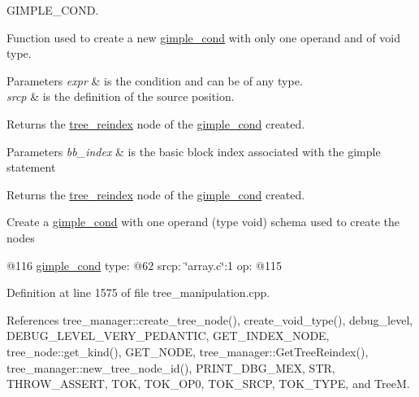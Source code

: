 G\+I\+M\+P\+L\+E\+\_\+\+C\+O\+ND. 

Function used to create a new \hyperlink{structgimple__cond}{gimple\+\_\+cond} with only one operand and of void type. 
\begin{DoxyParams}{Parameters}
{\em expr} & is the condition and can be of any type. \\
\hline
{\em srcp} & is the definition of the source position. \\
\hline
\end{DoxyParams}
\begin{DoxyReturn}{Returns}
the \hyperlink{classtree__reindex}{tree\+\_\+reindex} node of the \hyperlink{structgimple__cond}{gimple\+\_\+cond} created. 
\end{DoxyReturn}

\begin{DoxyParams}{Parameters}
{\em bb\+\_\+index} & is the basic block index associated with the gimple statement \\
\hline
\end{DoxyParams}
\begin{DoxyReturn}{Returns}
the \hyperlink{classtree__reindex}{tree\+\_\+reindex} node of the \hyperlink{structgimple__cond}{gimple\+\_\+cond} created.
\end{DoxyReturn}
Create a \hyperlink{structgimple__cond}{gimple\+\_\+cond} with one operand (type void) schema used to create the nodes

@116 \hyperlink{structgimple__cond}{gimple\+\_\+cond} type\+: @62 srcp\+: \char`\"{}array.\+c\char`\"{}\+:1 op\+: @115 

Definition at line 1575 of file tree\+\_\+manipulation.\+cpp.



References tree\+\_\+manager\+::create\+\_\+tree\+\_\+node(), create\+\_\+void\+\_\+type(), debug\+\_\+level, D\+E\+B\+U\+G\+\_\+\+L\+E\+V\+E\+L\+\_\+\+V\+E\+R\+Y\+\_\+\+P\+E\+D\+A\+N\+T\+IC, G\+E\+T\+\_\+\+I\+N\+D\+E\+X\+\_\+\+N\+O\+DE, tree\+\_\+node\+::get\+\_\+kind(), G\+E\+T\+\_\+\+N\+O\+DE, tree\+\_\+manager\+::\+Get\+Tree\+Reindex(), tree\+\_\+manager\+::new\+\_\+tree\+\_\+node\+\_\+id(), P\+R\+I\+N\+T\+\_\+\+D\+B\+G\+\_\+\+M\+EX, S\+TR, T\+H\+R\+O\+W\+\_\+\+A\+S\+S\+E\+RT, T\+OK, T\+O\+K\+\_\+\+O\+P0, T\+O\+K\+\_\+\+S\+R\+CP, T\+O\+K\+\_\+\+T\+Y\+PE, and TreeM.

